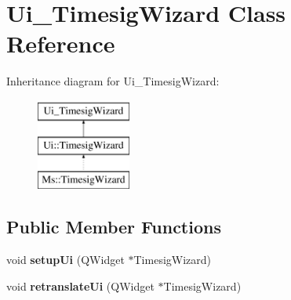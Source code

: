 \hypertarget{class_ui___timesig_wizard}{}\section{Ui\+\_\+\+Timesig\+Wizard Class Reference}
\label{class_ui___timesig_wizard}
Inheritance diagram for Ui\+\_\+\+Timesig\+Wizard\+:\begin{figure}[H]
\begin{center}
\leavevmode
\includegraphics[height=3.000000cm]{class_ui___timesig_wizard}
\end{center}
\end{figure}
\subsection*{Public Member Functions}
\begin{DoxyCompactItemize}
\item 
\mbox{\label{class_ui___timesig_wizard_a7e804ecbb1ed92ef4df74a9d8d31db95}} 
void {\bfseries setup\+Ui} (Q\+Widget $\ast$Timesig\+Wizard)
\item 
\mbox{\label{class_ui___timesig_wizard_a4783c5c2711f310cb18846eb5c86fbd6}} 
void {\bfseries retranslate\+Ui} (Q\+Widget $\ast$Timesig\+Wizard)
\end{DoxyCompactItemize}
